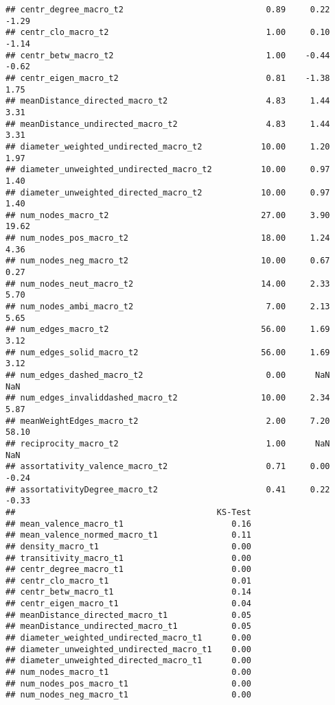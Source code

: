 \documentclass[
]{article}
\begin{document}
\begin{verbatim}
## centr_degree_macro_t2                             0.89     0.22        -1.29
## centr_clo_macro_t2                                1.00     0.10        -1.14
## centr_betw_macro_t2                               1.00    -0.44        -0.62
## centr_eigen_macro_t2                              0.81    -1.38         1.75
## meanDistance_directed_macro_t2                    4.83     1.44         3.31
## meanDistance_undirected_macro_t2                  4.83     1.44         3.31
## diameter_weighted_undirected_macro_t2            10.00     1.20         1.97
## diameter_unweighted_undirected_macro_t2          10.00     0.97         1.40
## diameter_unweighted_directed_macro_t2            10.00     0.97         1.40
## num_nodes_macro_t2                               27.00     3.90        19.62
## num_nodes_pos_macro_t2                           18.00     1.24         4.36
## num_nodes_neg_macro_t2                           10.00     0.67         0.27
## num_nodes_neut_macro_t2                          14.00     2.33         5.70
## num_nodes_ambi_macro_t2                           7.00     2.13         5.65
## num_edges_macro_t2                               56.00     1.69         3.12
## num_edges_solid_macro_t2                         56.00     1.69         3.12
## num_edges_dashed_macro_t2                         0.00      NaN          NaN
## num_edges_invaliddashed_macro_t2                 10.00     2.34         5.87
## meanWeightEdges_macro_t2                          2.00     7.20        58.10
## reciprocity_macro_t2                              1.00      NaN          NaN
## assortativity_valence_macro_t2                    0.71     0.00        -0.24
## assortativityDegree_macro_t2                      0.41     0.22        -0.33
##                                         KS-Test
## mean_valence_macro_t1                      0.16
## mean_valence_normed_macro_t1               0.11
## density_macro_t1                           0.00
## transitivity_macro_t1                      0.00
## centr_degree_macro_t1                      0.00
## centr_clo_macro_t1                         0.01
## centr_betw_macro_t1                        0.14
## centr_eigen_macro_t1                       0.04
## meanDistance_directed_macro_t1             0.05
## meanDistance_undirected_macro_t1           0.05
## diameter_weighted_undirected_macro_t1      0.00
## diameter_unweighted_undirected_macro_t1    0.00
## diameter_unweighted_directed_macro_t1      0.00
## num_nodes_macro_t1                         0.00
## num_nodes_pos_macro_t1                     0.00
## num_nodes_neg_macro_t1                     0.00

\end{verbatim}
\end{document}
